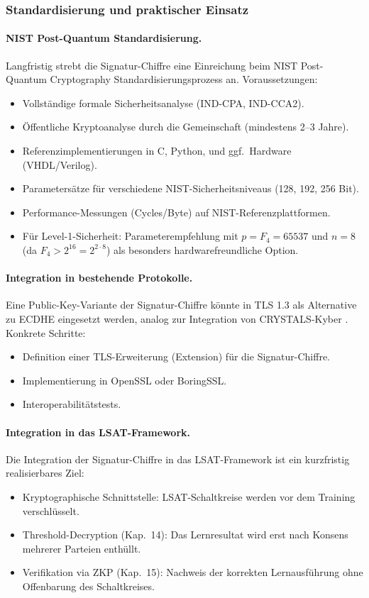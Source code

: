 ﻿\documentclass[a4paper,12pt]{scrreprt}
\theoremstyle{definition}
\begin{document}
\subsubsection{Standardisierung und praktischer Einsatz}

\paragraph{NIST Post-Quantum Standardisierung.}
Langfristig strebt die Signatur-Chiffre eine Einreichung beim NIST Post-Quantum Cryptography Standardisierungsprozess \cite{NIST22} an. Voraussetzungen:
\begin{itemize}
    \item Vollständige formale Sicherheitsanalyse (IND-CPA, IND-CCA2).
    \item Öffentliche Kryptoanalyse durch die Gemeinschaft (mindestens 2--3 Jahre).
    \item Referenzimplementierungen in C, Python, und ggf.\ Hardware (VHDL/Verilog).
    \item Parametersätze für verschiedene NIST-Sicherheitsniveaus (128, 192, 256 Bit).
    \item Performance-Messungen (Cycles/Byte) auf NIST-Referenzplattformen.
    \item Für Level-1-Sicherheit: Parameterempfehlung mit $p = F_4 = 65537$ und $n = 8$ (da $F_4 > 2^{16} = 2^{2\cdot8}$) als besonders hardwarefreundliche Option.
\end{itemize}

\paragraph{Integration in bestehende Protokolle.}
Eine Public-Key-Variante der Signatur-Chiffre könnte in TLS 1.3 \cite{Res18} als Alternative zu ECDHE eingesetzt werden, analog zur Integration von CRYSTALS-Kyber \cite{ABD+22}. Konkrete Schritte:
\begin{itemize}
    \item Definition einer TLS-Erweiterung (Extension) für die Signatur-Chiffre.
    \item Implementierung in OpenSSL oder BoringSSL.
    \item Interoperabilitätstests.
\end{itemize}

\paragraph{Integration in das LSAT-Framework.}
Die Integration der Signatur-Chiffre in das LSAT-Framework \cite{Epp26d} ist ein kurzfristig realisierbares Ziel:
\begin{itemize}
    \item Kryptographische Schnittstelle: LSAT-Schaltkreise werden vor dem Training verschlüsselt.
    \item Threshold-Decryption (Kap.~14): Das Lernresultat wird erst nach Konsens mehrerer Parteien enthüllt.
    \item Verifikation via ZKP (Kap.~15): Nachweis der korrekten Lernausführung ohne Offenbarung des Schaltkreises.
\end{itemize}
\end{document}

